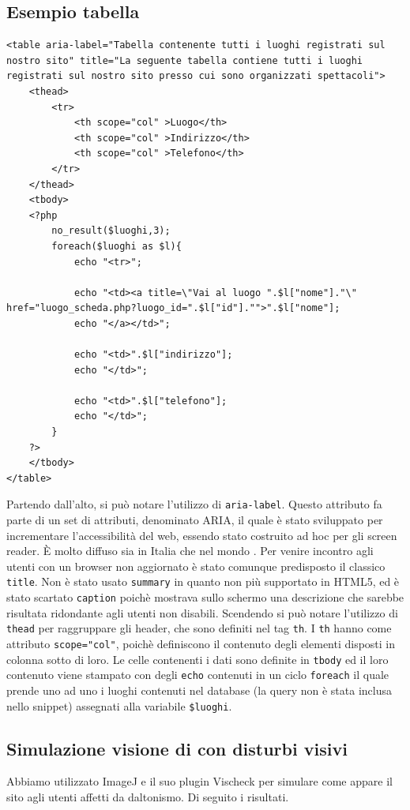 \documentclass[10pt, a4paper]{article}
\begin{document}
\subsection{Esempio tabella}
\begin{lstlisting}[caption={luoghi.php},captionpos=b]
<table aria-label="Tabella contenente tutti i luoghi registrati sul nostro sito" title="La seguente tabella contiene tutti i luoghi registrati sul nostro sito presso cui sono organizzati spettacoli">
	<thead>
		<tr>
			<th scope="col" >Luogo</th>
			<th scope="col" >Indirizzo</th>
			<th scope="col" >Telefono</th>
		</tr>
	</thead>
	<tbody>
	<?php
		no_result($luoghi,3);
		foreach($luoghi as $l){
			echo "<tr>";
			
			echo "<td><a title=\"Vai al luogo ".$l["nome"]."\" href="luogo_scheda.php?luogo_id=".$l["id"]."">".$l["nome"];
			echo "</a></td>";
			
			echo "<td>".$l["indirizzo"];
			echo "</td>";
			
			echo "<td>".$l["telefono"];
			echo "</td>";
		}
	?>
	</tbody>
</table> 

\end{lstlisting}


Partendo dall'alto, si può notare l'utilizzo di \texttt{aria-label}. Questo attributo fa parte di un set di attributi, denominato ARIA\cite{ARIA}, il quale è stato sviluppato per incrementare l'accessibilità del web, essendo stato costruito ad hoc per gli screen reader. È molto diffuso sia in Italia che nel mondo \cite{Diffusione ARIA}. Per venire incontro agli utenti con un browser non aggiornato è stato comunque predisposto il classico \texttt{title}. Non è stato usato \texttt{summary} in quanto non più supportato in HTML5, ed è stato scartato \texttt{caption} poichè mostrava sullo schermo una descrizione che sarebbe risultata ridondante agli utenti non disabili.
Scendendo si può notare l'utilizzo di \texttt{thead} per raggruppare gli header, che sono definiti nel tag \texttt{th}. I \texttt{th} hanno come attributo \texttt{scope="col"}, poichè definiscono il contenuto degli elementi disposti in colonna sotto di loro. Le celle contenenti i dati sono definite in \texttt{tbody} ed il loro contenuto viene stampato con degli \texttt{echo} contenuti in un ciclo \texttt{foreach} il quale prende uno ad uno i luoghi contenuti nel database (la query non è stata inclusa nello snippet) assegnati alla variabile \texttt{\$luoghi}.

\subsection{Simulazione visione di con disturbi visivi}
Abbiamo utilizzato ImageJ\cite{ImageJ} e il suo plugin Vischeck\cite{Vischeck} per simulare come appare il sito agli utenti affetti da daltonismo. Di seguito i risultati.
\end{document}
